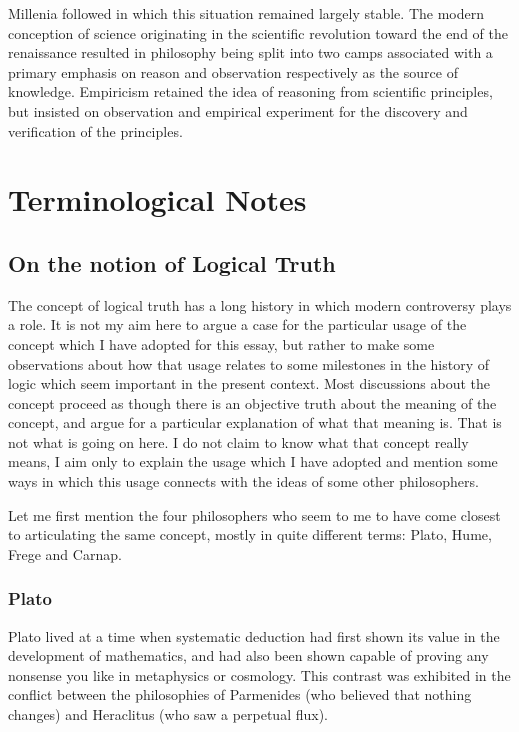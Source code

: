 \documentclass[10pt,titlepage]{article}
\begin{document}
Millenia followed in which this situation remained largely stable.
The modern conception of science originating in the scientific revolution toward the end of the renaissance resulted in philosophy being split into two camps associated with a primary emphasis on reason and observation respectively as the source of knowledge.
Empiricism retained the idea of reasoning from scientific principles, but insisted on observation and empirical experiment for the discovery and verification of the principles.

\appendix

\section{Terminological Notes}

\subsection{On the notion of Logical Truth}

The concept of logical truth has a long history in which modern controversy plays a role.
It is not my aim here to argue a case for the particular usage of the concept which I have adopted for this essay, but rather to make some observations about how that usage relates to some milestones in the history of logic which seem important in the present context.
Most discussions about the concept proceed as though there is an objective truth about the meaning of the concept, and argue for a particular explanation of what that meaning is.
That is not what is going on here.
I do not claim to know what that concept really means, I aim only to explain the usage which I have adopted and mention some ways in which this usage connects with the ideas of some other philosophers.

Let me first mention the four philosophers who seem to me to have come closest to articulating the same concept, mostly in quite different terms: Plato, Hume, Frege and Carnap.


\subsubsection{Plato}

Plato lived at a time when systematic deduction had first shown its value in the development of mathematics, and had also been shown capable of proving any nonsense you like in metaphysics or cosmology.
This contrast was exhibited in the conflict between the philosophies of Parmenides (who believed that nothing changes) and Heraclitus (who saw a perpetual flux).
\end{document}
